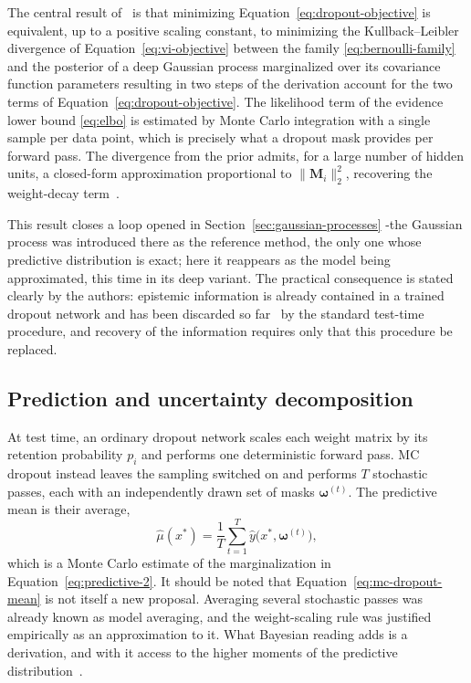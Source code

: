 The central result of~\cite{gal2016} is that minimizing Equation~\eqref{eq:dropout-objective} is equivalent, up to a positive scaling constant, to minimizing the Kullback--Leibler divergence of
Equation~\eqref{eq:vi-objective} between the family \eqref{eq:bernoulli-family} and the posterior of a deep Gaussian process marginalized over its covariance function parameters resulting in two steps of the derivation account for the two terms of Equation~\eqref{eq:dropout-objective}. The likelihood term of the evidence lower bound \eqref{eq:elbo} is estimated by Monte Carlo integration with a single sample per data point, which is precisely what a dropout mask provides per forward pass. The divergence from the prior admits, for a large number of hidden units, a closed-form approximation proportional to $\lVert \mathbf{M}_i \rVert_2^2$, recovering the weight-decay  term~\cite{gal2016appendix}.

This result closes a loop opened in Section~\ref{sec:gaussian-processes} -the
Gaussian process was introduced there as the reference method, the only one whose
predictive distribution is exact; here it reappears as the model being approximated, this time in its deep variant. The practical consequence is stated clearly by the authors: epistemic information is already contained in a trained dropout network and has been discarded so far~\cite{gal2016} by the standard test-time procedure, and recovery of the information
requires only that this procedure be replaced.

\subsection{Prediction and uncertainty decomposition}
\label{subsec:mc-dropout-prediction}

At test time, an ordinary dropout network scales each weight matrix by its retention probability $p_i$ and performs one deterministic forward pass. MC dropout instead leaves the sampling switched on and performs $T$ stochastic passes, each with an independently drawn set of masks $\boldsymbol{\omega}^{(t)}$. The predictive mean is their average,
%
\begin{equation}
    \hat{\mu}(x^\ast)
    = \frac{1}{T} \sum_{t=1}^{T}
      \hat{y}\bigl(x^\ast, \boldsymbol{\omega}^{(t)}\bigr) ,
    \label{eq:mc-dropout-mean}
\end{equation}
%
which is a Monte Carlo estimate of the marginalization in Equation~\eqref{eq:predictive-2}. It should be noted that Equation~\eqref{eq:mc-dropout-mean} is not itself a new proposal. Averaging
several stochastic passes was already known as model averaging, and the  weight-scaling rule was justified empirically as an approximation to it. What Bayesian reading adds is a derivation, and with it access to the higher moments of the predictive distribution~\cite{gal2016}.

